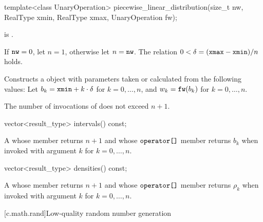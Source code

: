%
\begin{itemdecl}
template<class UnaryOperation>
  piecewise_linear_distribution(size_t nw, RealType xmin, RealType xmax, UnaryOperation fw);
\end{itemdecl}

\begin{itemdescr}
\pnum
\mandates
{} is .

\pnum
\expects
 If $\tcode{nw} = 0$, let $n = 1$, otherwise let $n = \tcode{nw}$.
 The relation $0 < \delta = (\tcode{xmax} - \tcode{xmin}) / n$
 holds.

\pnum
\effects
Constructs a  object
 with parameters taken or calculated
 from the following values:
 Let $b_k = \tcode{xmin} + k \cdot \delta$ for $k = 0, \dotsc, n$,
 and $w_k = \tcode{fw}(b_k)$ for $k = 0, \dotsc, n$.

\pnum
\complexity
The number of invocations of  does not exceed $n+1$.
\end{itemdescr}

%
\begin{itemdecl}
vector<result_type> intervals() const;
\end{itemdecl}

\begin{itemdescr}
\pnum
\returns
A 
 whose  member returns $n + 1$
 and whose $ \tcode{operator[]} $ member returns $b_k$
 when invoked with argument $k$ for $k = 0, \dotsc, n$.
\end{itemdescr}

%
\begin{itemdecl}
vector<result_type> densities() const;
\end{itemdecl}

\begin{itemdescr}
\pnum
\returns
A 
 whose  member returns $n + 1$
 and whose $ \tcode{operator[]} $ member returns $\rho_k$
 when invoked with argument $k$ for $k = 0, \dotsc, n$.
\end{itemdescr}%
%
%
%
%

[c.math.rand]{Low-quality random number generation}

